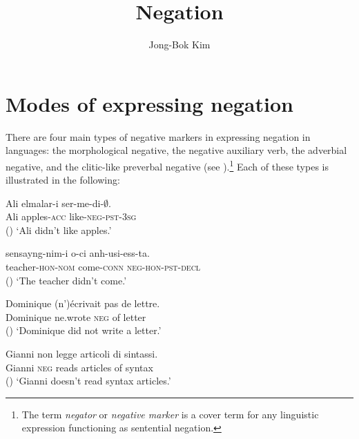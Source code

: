 \documentclass[output=paper
	        ,collection
	        ,collectionchapter
 	        ,biblatex
                ,babelshorthands
                ,newtxmath
                ,draftmode
                ,colorlinks, citecolor=brown
]{langscibook}
\author{Jong-Bok Kim\affiliation{Kyung Hee University, Seoul}}
\title{Negation}
\begin{document}
\maketitle
\label{chap-negation}




\section{Modes of expressing negation}
\label{sec-modes-of-expressing-negation}


There are four main types of negative markers
in expressing negation in languages: the morphological negative,
the negative auxiliary verb, the adverbial negative, and the clitic-like
 preverbal negative (see \citealt{Dahl:79, Payne:85, Zanuttini:2001, Dryer:05}).\footnote{The term \textit{negator} or \textit{negative marker} is a cover term for any linguistic expression functioning as sentential negation.}
Each of these types is illustrated in the following:

\eal
\ex\label{negation-1a}
\gll Ali  elmalar-i  ser-me-di-$\emptyset$. \\
Ali apples-\textsc{acc}  like-\textsc{neg}-\textsc{pst}-\textsc{3sg} \\ \hfill ()
\glt `Ali didn't like apples.'

\ex\label{negation-1b}
\gll sensayng-nim-i o-ci anh-usi-ess-ta. \\
teacher-\textsc{hon}-\textsc{nom} come-\textsc{conn} \textsc{neg}-\textsc{hon}-\textsc{pst}-\textsc{decl} \\  \hfill ()
\glt `The teacher didn't come.'

\ex \label{negation-1c}
\gll Dominique (n')\'{e}crivait pas de lettre.\\
     Dominique ne.wrote \textsc{neg} of letter \\ \hfill ()
\glt `Dominique did not write a letter.'

\ex \label{negation-1d}
\gll Gianni non legge articoli di sintassi. \\
Gianni \textsc{neg} reads articles of syntax \\ \hfill ()
\glt `Gianni doesn't read syntax articles.'
\zl
\end{document}

